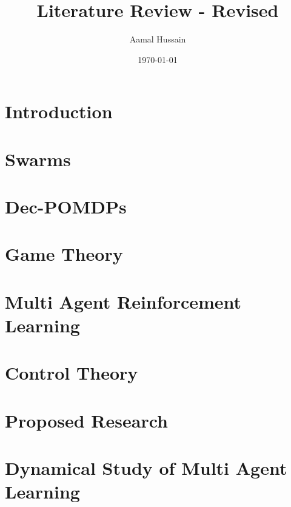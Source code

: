 \documentclass[11pt]{report}
\title{Literature Review - Revised}
\author{Aamal Hussain}
\date{\today}
\begin{document}
\maketitle 

\tableofcontents

\chapter{Introduction}  \label{ch::Intro}

\chapter{Swarms}  \label{ch::Swarms}

\chapter{Dec-POMDPs}  \label{ch::Dec-POMDPs}

\chapter{Game Theory}  \label{ch::GameTheory}

\chapter{Multi Agent Reinforcement Learning}  \label{ch::MARL}

\chapter{Control Theory}  \label{ch::ControlTheory}

\chapter{Proposed Research}  \label{ch::Proposals}

\chapter{Dynamical Study of Multi Agent Learning}  \label{ch::DynMARL}

 


\end{document}
